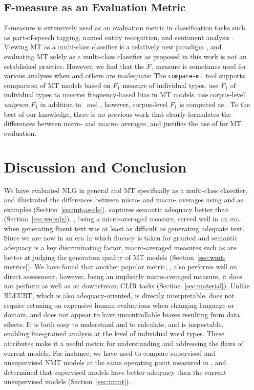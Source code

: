 \subsection{F-measure as an Evaluation Metric}
F-measure \cite{Rijsbergen-1979-F-meas, chinchor-1992-F-meas} is extensively used as an evaluation metric in classification tasks such as part-of-speech tagging, named entity recognition, and sentiment analysis \cite{derczynski-2016-f-score}.
Viewing MT as a multi-class classifier is a relatively new paradigm \cite{gowda-may-2020-finding}, and evaluating MT solely as a multi-class classifier as proposed in this work is not an established practice.
However, we find that the $F_1$ measure is sometimes used for various analyses when \bleu{} and others are inadequate: The \texttt{compare-mt} tool \citep{neubig-etal-2019-compareMT} supports comparison of MT models based on $F_1$ measure of individual types.
\citet{gowda-may-2020-finding} use $F_1$ of individual types to uncover frequency-based bias in MT models.
\citet{sennrich-etal-2016-bpe} use corpus-level \textit{unigram $F_1$} in addition to \bleu\ and \chrf{}, however, corpus-level $F_1$ is computed as .
To the best of our knowledge, there is no previous work that clearly formulates the differences between micro- and macro- averages, and justifies the use of  for MT evaluation. 



\section{Discussion and Conclusion}
We have evaluated NLG in general and MT specifically as a multi-class classifier, and illustrated the differences between micro- and macro- averages using  and  as examples (Section~\ref{sec:mt-as-cls}).
 captures semantic adequacy better than  (Section~\ref{sec:webnlg}).
\bleu, being a micro-averaged measure, served well in an era when generating fluent text was at least as difficult as generating adequate text. Since we are now in an era in which fluency is taken for granted and semantic adequacy is a key discriminating factor, macro-averaged measures such as  are better at judging the generation quality of MT models (Section~\ref{sec:wmt-metrics}).
We have found that another popular metric, , also performs well on direct assessment,
however, being an implicitly micro-averaged measure, it does not perform as well as  on downstream CLIR tasks (Section~\ref{sec:material}).
Unlike BLEURT, which is also adequacy-oriented,  is directly interpretable, does not require retuning on expensive human evaluations when changing language or domain, and does not appear to have uncontrollable biases resulting from data effects.
It is both easy to understand and to calculate, and is  
inspectable, enabling fine-grained analysis at the level of individual word types. These attributes make it a useful metric for understanding and addressing the flaws of current models. For instance, we have used  to compare supervised and unsupervised NMT models at the same operating point measured in \bleu, and determined that supervised models have better adequacy than the current unsupervised models (Section~\ref{sec:unmt}).

